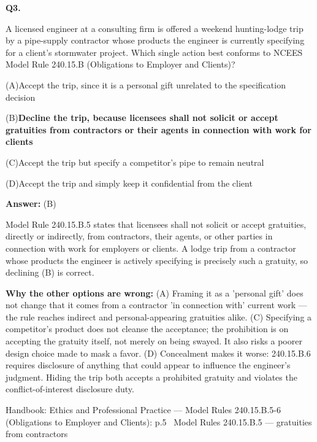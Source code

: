 \documentclass[11pt]{article}
\newcommand{\correct}[1]{\textbf{#1}\;{\color{accent}$\checkmark$}}
\newcommand{\optline}[2]{\par\noindent\hspace{1.2em}(#1)\hspace{0.6em}#2}
\begin{document}
\vspace{9pt}
\filbreak
\textbf{\color{accent}Q3.}\par\vspace{2pt}
A licensed engineer at a consulting firm is offered a weekend hunting-lodge trip by a pipe-supply contractor whose products the engineer is currently specifying for a client's stormwater project. Which single action best conforms to NCEES Model Rule 240.15.B (Obligations to Employer and Clients)?\par\par\vspace{3pt}
\optline{A}{Accept the trip, since it is a personal gift unrelated to the specification decision}
\optline{B}{\correct{Decline the trip, because licensees shall not solicit or accept gratuities from contractors or their agents in connection with work for clients}}
\optline{C}{Accept the trip but specify a competitor's pipe to remain neutral}
\optline{D}{Accept the trip and simply keep it confidential from the client}
\par\vspace{3pt}
\vspace{2pt}\par\noindent\colorbox{boxbg}{\parbox{\dimexpr\linewidth-2\fboxsep\relax}{%
\vspace{2pt}\textbf{Answer:} (B)\par\vspace{2pt}
{\small Model Rule 240.15.B.5 states that licensees shall not solicit or accept gratuities, directly or indirectly, from contractors, their agents, or other parties in connection with work for employers or clients. A lodge trip from a contractor whose products the engineer is actively specifying is precisely such a gratuity, so declining (B) is correct.\par
\textbf{Why the other options are wrong:} (A) Framing it as a 'personal gift' does not change that it comes from a contractor 'in connection with' current work --- the rule reaches indirect and personal-appearing gratuities alike. (C) Specifying a competitor's product does not cleanse the acceptance; the prohibition is on accepting the gratuity itself, not merely on being swayed. It also risks a poorer design choice made to mask a favor. (D) Concealment makes it worse: 240.15.B.6 requires disclosure of anything that could appear to influence the engineer's judgment. Hiding the trip both accepts a prohibited gratuity and violates the conflict-of-interest disclosure duty.\par}\par\vspace{2pt}
{\footnotesize\color{soft}Handbook: Ethics and Professional Practice --- Model Rules 240.15.B.5-6 (Obligations to Employer and Clients): p.5 \textbullet\ Model Rules 240.15.B.5 --- gratuities from contractors}\vspace{2pt}
}}
\end{document}
